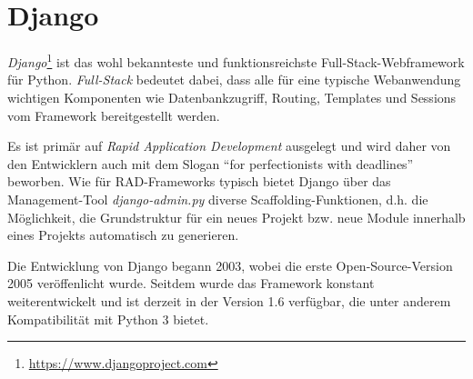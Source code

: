 \section{Django}

\emph{Django}\footnote{\href{https://www.djangoproject.com}{https://www.djangoproject.com}} ist das
wohl bekannteste und funktionsreichste Full-Stack-Webframework für Python. \emph{Full-Stack}
bedeutet dabei, dass alle für eine typische Webanwendung wichtigen Komponenten wie Datenbankzugriff,
Routing, Templates und Sessions vom Framework bereitgestellt werden.

Es ist primär auf \emph{Rapid Application Development} ausgelegt und wird daher von den Entwicklern
auch mit dem Slogan \enquote{for perfectionists with deadlines} beworben. Wie für RAD-Frameworks
typisch bietet Django über das Management-Tool \emph{django-admin.py} diverse
Scaffolding-Funktionen, d.h. die Möglichkeit, die Grundstruktur für ein neues Projekt bzw. neue
Module innerhalb eines Projekts automatisch zu generieren.

Die Entwicklung von Django begann 2003, wobei die erste Open-Source-Version 2005 veröffenlicht
wurde. Seitdem wurde das Framework konstant weiterentwickelt und ist derzeit in der Version 1.6
verfügbar, die unter anderem Kompatibilität mit Python 3 bietet.


